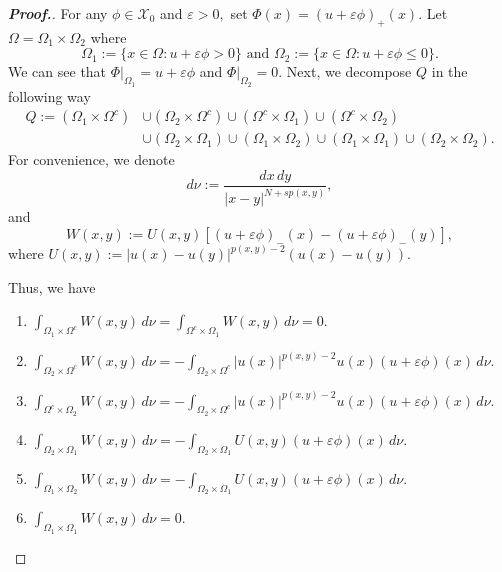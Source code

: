 \documentclass[10pt,a4paper]{amsart}
\newcommand{\Q}{\textit{Q}}
\newcommand{\X}{\mathcal{X}_{0}}
\newcommand{\ds} {\displaystyle}
\newcommand{\om} {\Omega}
\newcommand{\ve}{\varepsilon}
\begin{document}
\begin{proof}[\bf Proof.]
    For any $\phi\in \X$
and $\ve>0,$
set $\Phi(x)=(u+\ve\phi)_+(x).$
Let $\om=\om_1\times\om_2$
where
$$
    \om_1:=\{x\in\om:u+\ve\phi>0\}
    \text{ and } 
    \om_2:=\{x\in\om:u+\ve\phi\le0\}.
    $$
    We can see that $\Phi|_{\om_1}=u+\ve\phi$
and $\Phi|_{\om_2}=0.$
Next, we decompose $\Q$
in the following way
\begin{align*}
\Q:= (\om_1\times\om^c) 
& \cup(\om_2\times\om^c)
\cup(\om^c\times\om_1)  
  \cup (\om^c\times\om_2) \\ &
\cup(\om_2\times\om_1)\cup
 (\om_1\times\om_2)   \cup(\om_1\times\om_1)\cup
  (\om_2\times\om_2).
\end{align*}
For convenience, 
we denote 
$$
d \nu := \frac{dx \, dy}{|x-y|^{N+sp(x,y)}},
$$
and
$$
W(x,y):=U(x,y)[(u+\ve\phi)_-(x)-(u+\ve\phi)_-(y)] ,
$$
where $U(x,y):=|u(x)-u(y)|^{p(x,y)-2}(u(x)-u(y))$.

Thus, we have
\begin{enumerate}
\item[(i)]$\ds
\int_{\om_1\times\om^c}W(x,y)\,d\nu=
\int_{\om^c\times\om_1}W(x,y)\,d\nu=0.$

\item[(ii)]$\ds 
\int_{\om_2\times\om^c}W(x,y)\,d\nu=-
\int_{\om_2\times\om^c}|u(x)|^{p(x,y)-2}u(x)
(u+\ve\phi)(x) \,d\nu.$

\item[(iii)]$\ds 
\int_{\om^c\times\om_2}W(x,y)\,d\nu=-
\int_{\om_2\times\om^c}|u(x)|^{p(x,y)-2}u(x)
(u+\ve\phi)(x) \,d\nu.$

\item[(iv)]$\ds 
\int_{\om_2\times\om_1}W(x,y)\,d\nu=-
\int_{\om_2\times\om_1}U(x,y)(u+\ve\phi)
(x) \,d\nu.$

\item[(v)]$\ds 
\int_{\om_1\times\om_2}W(x,y)\,d\nu=-
\int_{\om_2\times\om_1}U(x,y)
(u+\ve\phi)(x) \,d\nu.$

\item[(vi)]$\ds 
\int_{\om_1\times\om_1}W(x,y)\,d\nu=0.$


\end{enumerate}
\end{proof}
\end{document}
